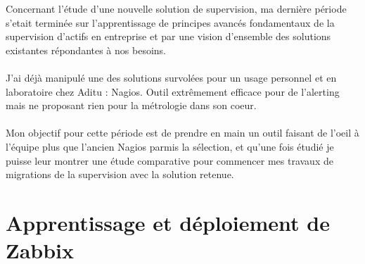\renewcommand{\figurename}{}

Concernant l'étude d'une nouvelle solution de supervision, ma dernière période s'etait terminée sur l'apprentissage de principes avancés fondamentaux de la supervision d'actifs en entreprise et par une vision d'ensemble des solutions existantes répondantes à nos besoins.
\\ \\
J'ai déjà manipulé une des solutions survolées pour un usage personnel et en laboratoire chez Aditu : Nagios. Outil extrêmement efficace pour de l'alerting mais ne proposant rien pour la métrologie dans son coeur.
\\ \\
Mon objectif pour cette période est de prendre en main un outil faisant de l'oeil à l'équipe plus que l'ancien Nagios parmis la sélection, et qu'une fois étudié je puisse leur montrer une étude comparative pour commencer mes travaux de migrations de la supervision avec la solution retenue.

\section{Apprentissage et déploiement de Zabbix}


